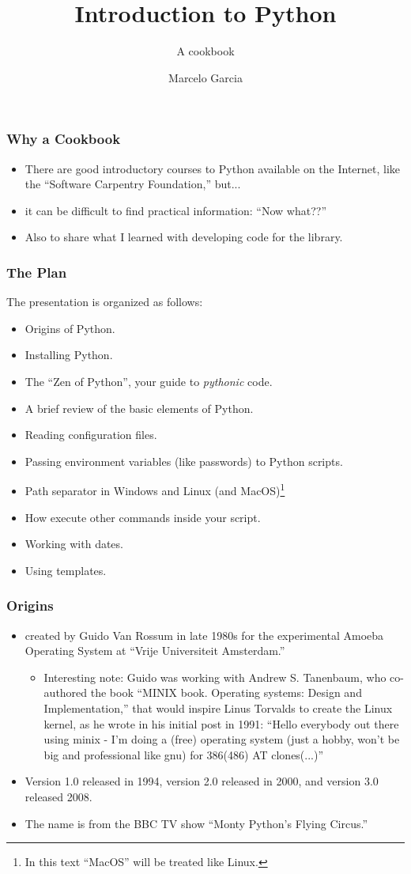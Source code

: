 \documentclass[aspectratio=169]{beamer}
\title{Introduction to Python}
\subtitle{A cookbook}
\author{Marcelo Garcia}
\institute{KAUST Library}
\date{}
\begin{document}
\frame{\titlepage}

\begin{frame}
\frametitle{Why a Cookbook}
\begin{itemize}
    \item There are good introductory courses to Python available on the Internet, like the ``Software Carpentry Foundation,'' but...
    \item it can be difficult to find practical information: ``Now what??''
    \item Also to share what I learned with developing code for the library.
\end{itemize}
    
\end{frame}

\begin{frame}
\frametitle{The Plan}
The presentation is organized as follows:
\begin{itemize}
    \item Origins of Python.
    \item Installing Python.
    \item The ``Zen of Python'', your guide to \emph{pythonic} code.
    \item A brief review of the basic elements of Python.
    \item Reading configuration files.
    \item Passing environment variables (like passwords) to Python scripts.
    \item Path separator in Windows and Linux (and MacOS)\footnote{In this text ``MacOS'' will be treated like Linux.}
    \item How execute other commands inside your script.
    \item Working with dates.
    \item Using templates.
\end{itemize}
    
\end{frame}

\begin{frame}
\frametitle{Origins}
\begin{itemize}
    \item created by Guido Van Rossum in late 1980s for the experimental Amoeba Operating System at ``Vrije Universiteit Amsterdam.'' 
    \begin{itemize}
        \item Interesting note: Guido was working with Andrew S. Tanenbaum, who co-authored the book ``MINIX book. Operating systems: Design and Implementation,'' that would inspire Linus Torvalds to create the Linux kernel, as he wrote in his initial post in 1991: ``Hello everybody out there using minix - I'm doing a (free) operating system (just a hobby, won't be big and professional like gnu) for 386(486) AT clones(...)''
    \end{itemize}
    \item Version 1.0 released in 1994, version 2.0 released in 2000, and version 3.0 released 2008.
    \item The name is from the BBC TV show ``Monty Python's Flying Circus.''
\end{itemize}
\end{frame}
\end{document}
